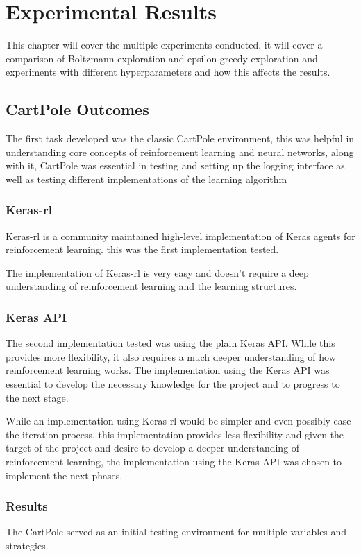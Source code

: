 \chapter{Experimental Results}
This chapter will cover the multiple experiments conducted, it will cover a comparison of Boltzmann exploration and epsilon greedy exploration and experiments with different hyperparameters and how this affects the results.

\section{CartPole Outcomes}
The first task developed was the classic CartPole environment,
this was helpful in understanding core concepts of reinforcement learning and neural networks, along with it,
CartPole was essential in testing and setting up the logging interface as well as testing different implementations of the learning algorithm 
\subsection*{Keras-rl}
Keras-rl is a community maintained high-level implementation of Keras agents for reinforcement learning. 
this was the first implementation tested.

The implementation of Keras-rl is very easy and doesn't require a deep understanding of reinforcement learning and the learning structures.
\subsection*{Keras API}
The second implementation tested was using the plain Keras API. While this provides more flexibility, it also requires a much deeper understanding of how reinforcement learning works.
The implementation using the Keras API was essential to develop the necessary knowledge for the project and to progress to the next stage.

While an implementation using Keras-rl would be simpler and even possibly ease the iteration process, this implementation provides less flexibility and given the target of the project and 
desire to develop a deeper understanding of reinforcement learning, the implementation using the Keras API was chosen to implement the next phases.

\subsection*{Results}
The CartPole served as an initial testing environment for multiple variables and strategies.

